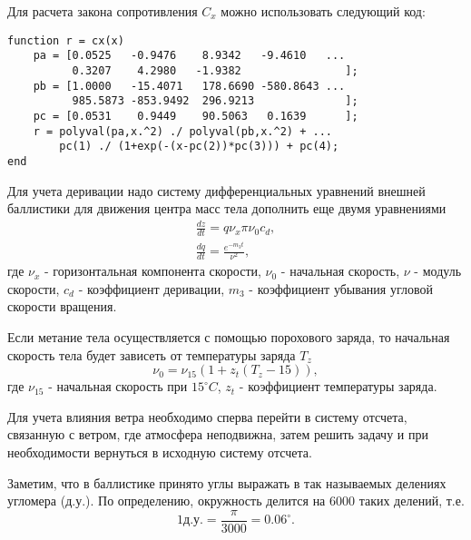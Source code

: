 Для расчета закона сопротивления $C_x$ можно использовать следующий код:
\begin{matlablisting}
	\begin{verbatim}
function r = cx(x)
    pa = [0.0525   -0.9476    8.9342   -9.4610   ...
          0.3207    4.2980   -1.9382                ];
    pb = [1.0000   -15.4071   178.6690 -580.8643 ... 
          985.5873 -853.9492  296.9213              ];
    pc = [0.0531    0.9449    90.5063   0.1639      ];
    r = polyval(pa,x.^2) ./ polyval(pb,x.^2) + ...
        pc(1) ./ (1+exp(-(x-pc(2))*pc(3))) + pc(4);
end
	\end{verbatim}
\end{matlablisting}
Для учета деривации надо систему дифференциальных уравнений внешней баллистики для движения центра масс тела дополнить еще двумя уравнениями
\begin{equation} \label{c13eq7}
	\begin{split}
		\frac{dz}{dt} = q \nu_x \pi \nu_0 c_d, \\
		\frac{dq}{dt} = \frac{e^{-m_3 t}}{\nu^2}, 
	\end{split}
\end{equation}
где $\nu_x$ - горизонтальная компонента скорости, $\nu_0$ - начальная скорость, $\nu$ - модуль скорости, $c_d$ - коэффициент деривации, $m_3$ - коэффициент убывания угловой скорости вращения.

Если метание тела осуществляется с помощью порохового заряда, то начальная скорость тела будет зависеть от температуры заряда $T_z$
\begin{equation} \label{c13eq8}
	\nu_0 = \nu_{15} \left( 1 + z_t \left( T_z - 15 \right) \right),
\end{equation}
где $\nu_{15}$ - начальная скорость при $15^\circ C$, $z_t$ - коэффициент температуры заряда.

Для учета влияния ветра необходимо сперва перейти в систему отсчета, связанную с ветром, где атмосфера неподвижна, затем решить задачу и при необходимости вернуться в исходную систему отсчета.

Заметим, что в баллистике принято углы выражать в так называемых делениях угломера (д.у.). По определению, окружность делится на 6000 таких делений, т.е.
\begin{equation} \label{c13eq9}
	1 \textit{д.у.} = \frac{\pi}{3000} = 0.06^\circ.
\end{equation}
